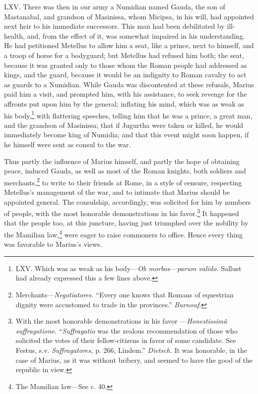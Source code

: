 LXV. There was then in our army a Numidian named Gauda, the son of
Mastanabal, and grandson of Masinissa, whom Micipsa, in his will, had
appointed next heir to his immediate successors. This man had been
debilitated by ill-health, and, from the effect of it, was somewhat
impaired in his understanding. He had petitioned Metellus to allow him
a seat, like a prince, next to himself, and a troop of horse for a
bodyguard; but Metellus had refused him both; the seat, because it was
granted only to those whom the Roman people had addressed as kings,
and the guard, because it would be an indignity to Roman cavalry to
act as guards to a Numidian. While Gauda was discontented at these
refusals, Marius paid him a visit, and prompted him, with his
assistance, to seek revenge for the affronts put upon him by the
general; inflating his mind, which was as weak as his body,\footnote{LXV. Which was as weak as his body—\emph{Ob morbos—parum valido.}
Sallust had already expressed this a few lines above.} with
flattering speeches, telling him that he was a prince, a great man,
and the grandson of Masinissa; that if Jugurtha were taken or killed,
he would immediately become king of Numidia; and that this event might
soon happen, if he himself were sent as consul to the war.

Thus partly the influence of Marius himself, and partly the hope of
obtaining peace, induced Gauda, as well as most of the Roman knights,
both soldiers and merchants,\footnote{Merchants—\emph{Negotiatores.} ``Every one knows that Romans of
equestrian dignity were accustomed to trade in the provinces.''
\emph{Burnouf}.} to write to their friends at Rome,
in a style of censure, respecting Metellus's management of the war,
and to intimate that Marius should be appointed general. The consulship,
accordingly, was solicited for him by numbers of people, with the most
honorable demonstrations in his favor.\footnote{With the most honorable demonstrations in his favor
—\emph{Honestissimâ suffragatione.} ``\emph{Suffragatio} was the zealous
recommendation of those who solicited the votes of their
fellow-citizens in favor of some candidate. See Festus, s.v.
\emph{Suffragatores,} p. 266, Lindem.'' \emph{Dietsch.} It was honorable, in
the case of Marius, as it was without bribery, and seemed to have
the good of the republic in view.} It happened that the
people too, at this juncture, having just triumphed over the nobility
by the Mamilian law,\footnote{The Mamilian law—See c. 40.} were eager to raise commoners to office.
Hence every thing was favorable to Marius's views.

